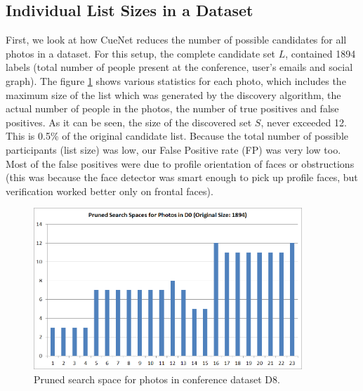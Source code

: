 \subsection{Individual List Sizes in a Dataset}
First, we look at how CueNet reduces the number of possible candidates for all photos in a dataset. For this setup, the complete candidate set $L$, contained 1894 labels (total number of people present at the conference, user's emails and social graph). The figure \ref{fig:exp-vldb-all-cx} shows various statistics for each photo, which includes the maximum size of the list which was generated by the discovery algorithm, the actual number of people in the photos, the number of true positives and false positives. As it can be seen, the size of the discovered set $S$, never exceeded 12. This is 0.5\% of the original candidate list. Because the total number of possible participants (list size) was low, our False Positive rate (FP) was very low too. Most of the false positives were due to profile orientation of faces or obstructions (this was because the face detector was smart enough to pick up profile faces, but verification worked better only on frontal faces).

\begin{figure}[t]
\centering
\includegraphics[width=0.9\textwidth]{media/reduced-list-sizes-d0.png}
\caption{Pruned search space for photos in conference dataset D8.}
\label{fig:exp-vldb-all-cx}
\end{figure}

